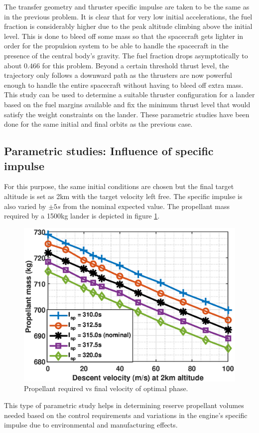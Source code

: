 The transfer geometry and thruster specific impulse are taken to be the same as in the previous problem. It is clear that for very low initial accelerations, the fuel fraction is considerably higher due to the peak altitude climbing above the initial level. This is done to bleed off some mass so that the spacecraft gets lighter in order for the propulsion system to be able to handle the spacecraft in the presence of the central body's gravity. The fuel fraction drops asymptotically to about $0.466$ for this problem. Beyond a certain threshold thrust level, the trajectory only follows a downward path as the thrusters are now powerful enough to handle the entire spacecraft without having to bleed off extra mass. This study can be used to determine a suitable thruster configuration for a lander based on the fuel margins available and fix the minimum thrust level that would satisfy the weight constraints on the lander. These parametric studies have been done for the same initial and final orbits as the previous case.
\subsection{Parametric studies: Influence of specific impulse}
For this purpose, the same initial conditions are chosen but the final target altitude is set as 2km with the target velocity left free. The specific impulse is also varied by $\pm 5s$ from the nominal expected value. The propellant mass required by a 1500kg lander is depicted in figure \ref{fig:parametric:3}.
\begin{figure}[H]
	\centering\includegraphics[width=0.90\linewidth]{FuelvsTerminalSpeed.eps}
	\caption{Propellant required vs final velocity of optimal phase.}
	\label{fig:parametric:3}
\end{figure}
This type of parametric study helps in determining reserve propellant volumes needed based on the control requirements and variations in the engine's specific impulse due to environmental and manufacturing effects. 
